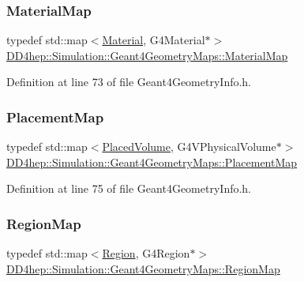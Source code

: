 \subsubsection{\texorpdfstring{Material\+Map}{MaterialMap}}
{\footnotesize\ttfamily typedef std\+::map$<$\hyperlink{class_d_d4hep_1_1_geometry_1_1_material}{Material}, G4\+Material$\ast$$>$ \hyperlink{namespace_d_d4hep_1_1_simulation_1_1_geant4_geometry_maps_a0ae377c64e684c47bd3045a9d3d8e248}{D\+D4hep\+::\+Simulation\+::\+Geant4\+Geometry\+Maps\+::\+Material\+Map}}



Definition at line 73 of file Geant4\+Geometry\+Info.\+h.

\hypertarget{namespace_d_d4hep_1_1_simulation_1_1_geant4_geometry_maps_a587c0a02d3847f03e6427093c90e93d2}{}\label{namespace_d_d4hep_1_1_simulation_1_1_geant4_geometry_maps_a587c0a02d3847f03e6427093c90e93d2} 
\subsubsection{\texorpdfstring{Placement\+Map}{PlacementMap}}
{\footnotesize\ttfamily typedef std\+::map$<$\hyperlink{class_d_d4hep_1_1_geometry_1_1_placed_volume}{Placed\+Volume}, G4\+V\+Physical\+Volume$\ast$$>$ \hyperlink{namespace_d_d4hep_1_1_simulation_1_1_geant4_geometry_maps_a587c0a02d3847f03e6427093c90e93d2}{D\+D4hep\+::\+Simulation\+::\+Geant4\+Geometry\+Maps\+::\+Placement\+Map}}



Definition at line 75 of file Geant4\+Geometry\+Info.\+h.

\hypertarget{namespace_d_d4hep_1_1_simulation_1_1_geant4_geometry_maps_afb7f77d7599fee831bfb2341123e8377}{}\label{namespace_d_d4hep_1_1_simulation_1_1_geant4_geometry_maps_afb7f77d7599fee831bfb2341123e8377} 
\subsubsection{\texorpdfstring{Region\+Map}{RegionMap}}
{\footnotesize\ttfamily typedef std\+::map$<$\hyperlink{class_d_d4hep_1_1_geometry_1_1_region}{Region}, G4\+Region$\ast$$>$ \hyperlink{namespace_d_d4hep_1_1_simulation_1_1_geant4_geometry_maps_afb7f77d7599fee831bfb2341123e8377}{D\+D4hep\+::\+Simulation\+::\+Geant4\+Geometry\+Maps\+::\+Region\+Map}}




